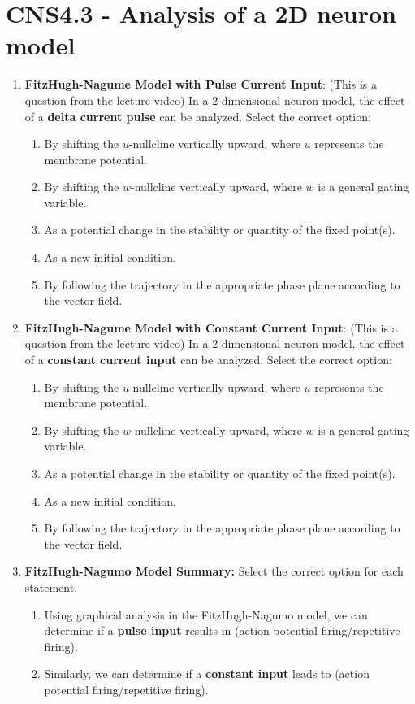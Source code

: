 \documentclass[11pt,letterpaper]{article}
\begin{document}
\section{CNS4.3 - Analysis of a 2D neuron model}
\begin{enumerate}
    \item \textbf{FitzHugh-Nagume Model with Pulse Current Input}: (This is a question from the lecture video) In a 2-dimensional neuron model, the effect of a \textbf{delta current pulse} can be analyzed. Select the correct option: 
    \begin{enumerate}
        \item By shifting the $u$-nullcline vertically upward, where $u$ represents the membrane potential.
        \item By shifting the $w$-nullcline vertically upward, where $w$ is a general gating variable.
        \item As a potential change in the stability or quantity of the fixed point(s).
        \item As a new initial condition.
        \item By following the trajectory in the appropriate phase plane according to the vector field.
    \end{enumerate}

    \item \textbf{FitzHugh-Nagume Model with Constant Current Input}: (This is a question from the lecture video) In a 2-dimensional neuron model, the effect of a \textbf{constant current input} can be analyzed. Select the correct option: 
    \begin{enumerate}
        \item By shifting the $u$-nullcline vertically upward, where $u$ represents the membrane potential.
        \item By shifting the $w$-nullcline vertically upward, where $w$ is a general gating variable.
        \item As a potential change in the stability or quantity of the fixed point(s).
        \item As a new initial condition.
        \item By following the trajectory in the appropriate phase plane according to the vector field.
    \end{enumerate}

    \item \textbf{FitzHugh-Nagumo Model Summary:} Select the correct option for each statement.
    \begin{enumerate}
        \item Using graphical analysis in the FitzHugh-Nagumo model, we can determine if a \textbf{pulse input} results in \underline{\hspace{2cm}} (action potential firing/repetitive firing).
        \item Similarly, we can determine if a \textbf{constant input} leads to \underline{\hspace{2cm}} (action potential firing/repetitive firing).
    \end{enumerate}


\end{enumerate}
\end{document}
